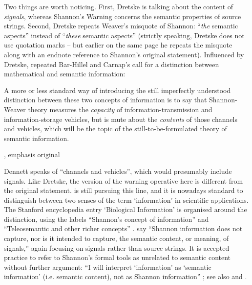 \documentclass[12pt]{article}
\begin{document}
\noindent Two things are worth noticing.
First, Dretske is talking about the content of \textit{signals}, whereas {\sc Shannon's Warning} concerns the semantic properties of source strings.
Second, Dretske repeats Weaver's misquote of Shannon: ``\textit{the} semantic aspects'' instead of ``\textit{these} semantic aspects'' (strictly speaking, Dretske does not use quotation marks -- but earlier on the same page he repeats the misquote along with an endnote reference to Shannon's original statement).
Influenced by Dretske, \citet{dennett1983intentional} repeated Bar-Hillel and Carnap's call for a distinction between mathematical and semantic information:

\begin{myquote}
A more or less standard way of introducing the still imperfectly understood distinction between these two concepts of information is to say that Shannon-Weaver theory measures the \emph{capacity} of information-transmission and information-storage vehicles, but is mute about the \emph{contents} of those channels and vehicles, which will be the topic of the still-to-be-formulated theory of semantic information.
\par\hspace*{\fill}\citet[344]{dennett1983intentional}, emphasis original
\end{myquote}

\noindent Dennett speaks of ``channels and vehicles'', which would presumably include signals.
Like Dretske, the version of the warning operative here is different from the original statement.
\citet[$\S$6]{dennett2017bacteria} is still pursuing this line, and it is nowadays standard to distinguish between two senses of the term `information' in scientific applications.
The Stanford encyclopedia entry `Biological Information' is organised around the distinction, using the labels ``Shannon's concept of information'' and ``Teleosemantic and other richer concepts'' \citep{godfrey-smith2016biological}.
\citet[21]{piccinini2011information} say ``Shannon information does not capture, nor is it intended to capture, the semantic content, or meaning, of signals,'' again focusing on signals rather than source strings.
It is accepted practice to refer to Shannon's formal tools as unrelated to semantic content without further argument: ``I will interpret ‘information’ as ‘semantic information’ (i.e. semantic content), not as Shannon information'' \citep[p. 12 n. 14]{artiga2020signals}; see also \citet[6]{cao2020new} and \citet[1]{kolchinsky2018semantic}.
\end{document}
